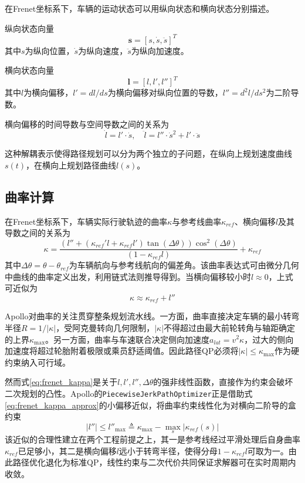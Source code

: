 在Frenet坐标系下，车辆的运动状态可以用纵向状态和横向状态分别描述。

纵向状态向量
\begin{equation}
\mathbf{s} = [s, \dot{s}, \ddot{s}]^T
\end{equation}
其中$s$为纵向位置，$\dot{s}$为纵向速度，$\ddot{s}$为纵向加速度。

横向状态向量
\begin{equation}
\mathbf{l} = [l, l', l'']^T
\end{equation}
其中$l$为横向偏移，$l' = dl/ds$为横向偏移对纵向位置的导数，$l'' = d^2l/ds^2$为二阶导数。

横向偏移的时间导数与空间导数之间的关系为
\begin{equation}
\dot{l} = l' \cdot \dot{s}, \quad \ddot{l} = l'' \cdot \dot{s}^2 + l' \cdot \ddot{s}
\end{equation}

这种解耦表示使得路径规划可以分为两个独立的子问题，在纵向上规划速度曲线$s(t)$，在横向上规划路径曲线$l(s)$。

\subsection{曲率计算}

在Frenet坐标系下，车辆实际行驶轨迹的曲率$\kappa$与参考线曲率$\kappa_{ref}$、横向偏移$l$及其导数之间的关系为
\begin{equation}
\kappa = \frac{(l'' + (\kappa_{ref}' l + \kappa_{ref} l') \tan(\Delta\theta)) \cos^2(\Delta\theta)}{(1 - \kappa_{ref} l)} + \kappa_{ref}
\label{eq:frenet_kappa}
\end{equation}
其中$\Delta\theta = \theta - \theta_{ref}$为车辆航向与参考线航向的偏差角。该曲率表达式可由微分几何中曲线的曲率定义出发，利用链式法则推导得到\cite{werling2010}。当横向偏移较小时$l \approx 0$，上式可近似为
\begin{equation}
\kappa \approx \kappa_{ref} + l''
\label{eq:frenet_kappa_approx}
\end{equation}

Apollo对曲率的关注贯穿整条规划流水线。一方面，曲率直接决定车辆的最小转弯半径$R = 1/|\kappa|$，受阿克曼转向几何限制，$|\kappa|$不得超过由最大前轮转角与轴距确定的上界$\kappa_{\max}$。另一方面，曲率与车速联合决定侧向加速度$a_{lat} = v^2 \kappa$，过大的侧向加速度将超过轮胎附着极限或乘员舒适阈值。因此路径QP必须将$|\kappa| \leq \kappa_{\max}$作为硬约束纳入可行域。

然而式\eqref{eq:frenet_kappa}是关于$l, l', l'', \Delta\theta$的强非线性函数，直接作为约束会破坏二次规划的凸性。Apollo的\texttt{PiecewiseJerkPathOptimizer}正是借助式\eqref{eq:frenet_kappa_approx}的小偏移近似，将曲率约束线性化为对横向二阶导的盒约束
\begin{equation}
|l''| \leq l''_{\max} \triangleq \kappa_{\max} - \max_s |\kappa_{ref}(s)|
\label{eq:lddot_bound}
\end{equation}
该近似的合理性建立在两个工程前提之上，其一是参考线经过平滑处理后自身曲率$\kappa_{ref}$已足够小，其二是横向偏移$l$远小于转弯半径，使得分母$1-\kappa_{ref} l$可取为一。由此路径优化退化为标准QP，线性约束与二次代价共同保证求解器可在实时周期内收敛。

